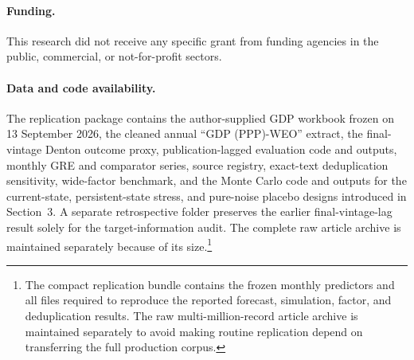 \documentclass[preprint,12pt,authoryear]{elsarticle}
\begin{document}
\paragraph{Funding.} This research did not receive any specific grant from funding agencies in the public, commercial, or not-for-profit sectors.

\paragraph{Data and code availability.} The replication package contains the author-supplied GDP workbook frozen on 13 September 2026, the cleaned annual ``GDP (PPP)-WEO'' extract, the final-vintage Denton outcome proxy, publication-lagged evaluation code and outputs, monthly GRE and comparator series, source registry, exact-text deduplication sensitivity, wide-factor benchmark, and the Monte Carlo code and outputs for the current-state, persistent-state stress, and pure-noise placebo designs introduced in Section~3. A separate retrospective folder preserves the earlier final-vintage-lag result solely for the target-information audit. The complete raw article archive is maintained separately because of its size.\footnote{The compact replication bundle contains the frozen monthly predictors and all files required to reproduce the reported forecast, simulation, factor, and deduplication results. The raw multi-million-record article archive is maintained separately to avoid making routine replication depend on transferring the full production corpus.}
\end{document}
